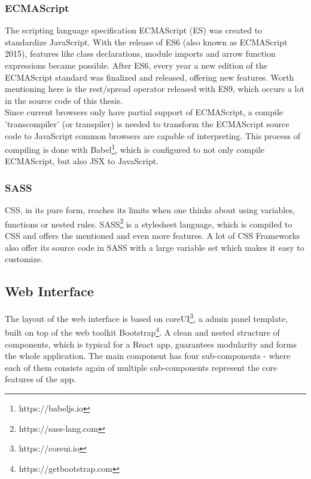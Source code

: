 \documentclass[a4paper,11pt,pdftex,halfparskip,cleardoubleempty]{scrbook}
\begin{document}
\subsubsection{ECMAScript}

The scripting language specification ECMAScript (ES) was created to standardize JavaScript. With the release of ES6 (also known as ECMAScript 2015), features like class declarations, module imports and arrow function expressions became possible. After ES6, every year a new edition of the ECMAScript standard was finalized and released, offering new features. Worth mentioning here is the rest/spread operator released with ES9, which occurs a lot in the source code of this thesis.\\
Since current browsers only have partial support of ECMAScript, a compile 'transcompiler' (or transpiler) is needed to transform the ECMAScript source code to JavaScript common browsers are capable of interpreting.
This process of compiling is done with Babel\footnote{https://babeljs.io}, which is configured to not only compile ECMAScript, but also JSX to JavaScript.

\subsubsection{SASS}

CSS, in its pure form, reaches its limits when one thinks about using variables, functions or nested rules. SASS\footnote{https://sass-lang.com} is a stylesheet language, which is compiled to CSS and offers the mentioned and even more features.
A lot of CSS Frameworks also offer its source code in SASS with a large variable set which makes it easy to customize.


\subsection{Web Interface}

The layout of the web interface is based on coreUI\footnote{https://coreui.io}, a admin panel template, built on top of the web toolkit Bootstrap\footnote{https://getbootstrap.com}. A clean and nested structure of components, which is typical for a React app, guarantees modularity and forms the whole application. The main component has four sub-components - where each of them consists again of multiple sub-components represent the core features of the app.
\end{document}

